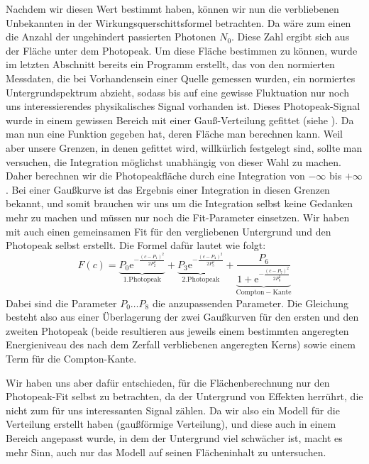 Nachdem wir diesen Wert bestimmt haben, können wir nun die verbliebenen
Unbekannten in der Wirkungsquerschittsformel betrachten. Da wäre zum einen die
Anzahl der ungehindert passierten Photonen $N_0$. Diese Zahl ergibt sich aus
der Fläche unter dem Photopeak. Um diese Fläche bestimmen zu können, wurde im
letzten Abschnitt bereits ein Programm erstellt, das von den normierten
Messdaten, die bei Vorhandensein einer Quelle gemessen wurden, ein normiertes
Untergrundspektrum abzieht, sodass bis auf eine gewisse Fluktuation nur noch
uns interessierendes physikalisches Signal vorhanden ist. Dieses
Photopeak-Signal wurde in einem gewissen Bereich mit einer Gauß-Verteilung
gefittet (siehe ). Da man nun eine
Funktion gegeben hat, deren Fläche man berechnen kann.
Weil aber unsere Grenzen, in denen gefittet wird, willkürlich festgelegt sind,
sollte man versuchen, die Integration möglichst unabhängig von dieser Wahl zu
machen. Daher berechnen wir die Photopeakfläche durch eine Integration von
$-\infty$ bis $+\infty$. Bei einer Gaußkurve ist das Ergebnis einer Integration
in diesen Grenzen bekannt, und somit brauchen wir uns um die Integration selbst
keine Gedanken mehr zu machen und müssen nur noch die Fit-Parameter einsetzen.
Wir haben mit  auch einen gemeinsamen Fit für den
vergliebenen Untergrund und den Photopeak selbst erstellt. Die Formel dafür
lautet wie folgt: 
\begin{equation*}
 F(c) = \underbrace{P_0\mathrm{e}^{-\frac{(c-P_1)^2}{2P_2^2}}}_{\mathrm{1.
Photopeak}} + \underbrace{P_3\mathrm{e}^{-\frac{(c-P_4)^2}{2P_5^2}}}_{\mathrm{2.
Photopeak}} +
\underbrace{\frac{P_6}{1+\mathrm{e}^{-\frac{(c-P_7)^2}{2P_8^2}}}}_{\mathrm{
Compton-Kante }}
\end{equation*}
Dabei sind die Parameter $P_0\dots P_8$ die anzupassenden Parameter. Die
Gleichung besteht also aus einer Überlagerung der zwei Gaußkurven für den
ersten und den zweiten Photopeak (beide resultieren aus jeweils einem bestimmten
angeregten Energieniveau des nach dem Zerfall verbliebenen angeregten Kerns)
sowie einem Term für die Compton-Kante.

Wir haben uns aber dafür entschieden, für die Flächenberechnung
nur den Photopeak-Fit selbst zu betrachten, da der Untergrund von Effekten
herrührt, die nicht zum für uns interessanten Signal zählen. Da wir also ein
Modell für die Verteilung erstellt haben (gaußförmige Verteilung), und diese
auch in einem Bereich angepasst wurde, in dem der Untergrund viel schwächer ist,
macht es mehr Sinn, auch nur das Modell auf seinen Flächeninhalt zu untersuchen.

